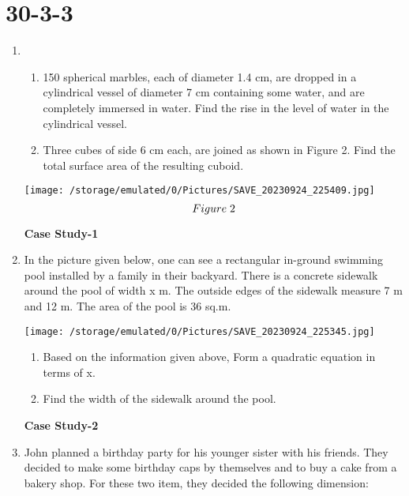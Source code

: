 \documentclass[15pt]{article}
\begin{document}
     \section{30-3-3}
     \begin{enumerate}
         \item \begin{enumerate}
           \item 150 spherical marbles, each of diameter 1.4 cm, are dropped in a cylindrical vessel of diameter 7 cm containing some water, and are completely immersed in water. Find the rise in the level of water in the cylindrical vessel.
           \item Three cubes of side 6 cm each, are joined as shown in Figure 2.
           Find the total surface area of the resulting cuboid.
       \end{enumerate}
       \begin{center}
            \texttt{[image:              /storage/emulated/0/Pictures/SAVE\_20230924\_225409.jpg]}
            $$Figure\hspace{0.1cm} 2$$
       \end{center}
             \begin{center}
            \textbf{Case Study-1}\\
            \end{center}
               
     \item In the picture given below, one can see a rectangular in-ground swimming pool installed by a family in their backyard. There is a concrete sidewalk around the pool of width x m. The outside edges of the sidewalk measure 7 m and 12 m. The area of the pool is 36 sq.m.
            \begin{center}
                \texttt{[image:            /storage/emulated/0/Pictures/SAVE\_20230924\_225345.jpg]}
            \end{center}
            \begin{enumerate}
                \item Based on the information given above, Form a quadratic equation in terms of x.
                \item Find the width of the sidewalk around the pool.
            \end{enumerate}
            \begin{center}
                \textbf{Case Study-2}
            \end{center}
     \item John planned a birthday party for his younger sister with his friends. They decided to make some birthday caps by themselves and to buy a cake from a bakery shop. For these two item, they decided the following dimension:
     

\end{enumerate}
\end{document}
